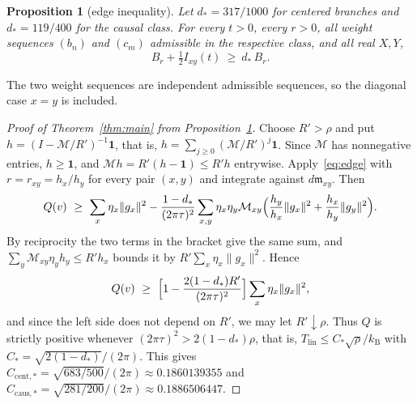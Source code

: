 \documentclass[10pt]{article}
\newtheorem{proposition}[theorem]{Proposition}
\theoremstyle{remark}
\newcommand{\kB}{k_{\mathrm B}}
\newcommand{\Tlin}{T_{\mathrm{lin}}}
\newcommand{\dstar}{d_{*}}
\begin{document}
\begin{proposition}[edge inequality]\label{prop:edge}
Let $\dstar=317/1000$ for centered branches and $\dstar=119/400$ for the causal class. For every $t>0$, every $r>0$, all weight sequences $(b_n)$ and $(c_m)$ admissible in the respective class, and all real $X,Y$,
\begin{equation}\label{eq:edge}
B_r+\tfrac12I_{xy}(t)\ \ge\ \dstar\,B_r .
\end{equation}
\end{proposition}

The two weight sequences are independent admissible sequences, so the diagonal case $x=y$ is included.

\begin{proof}[Proof of Theorem~\ref{thm:main} from Proposition~\ref{prop:edge}]
Choose $R'>\rho$ and put $h=(I-\mathcal M/R')^{-1}\mathbf 1$, that is, $h=\sum_{j\ge0}(\mathcal M/R')^j\mathbf 1$. Since $\mathcal M$ has nonnegative entries, $h\ge\mathbf 1$, and $\mathcal Mh=R'(h-\mathbf 1)\le R'h$ entrywise. Apply~\eqref{eq:edge} with $r=r_{xy}=h_x/h_y$ for every pair $(x,y)$ and integrate against $d\mathfrak m_{xy}$. Then
\[
Q(v)\ \ge\ \sum_x\eta_x\|g_x\|^2-\frac{1-\dstar}{(2\pi\tau)^2}\sum_{x,y}\eta_x\eta_y\mathcal M_{xy}\Bigl(\frac{h_y}{h_x}\|g_x\|^2+\frac{h_x}{h_y}\|g_y\|^2\Bigr).
\]
By reciprocity the two terms in the bracket give the same sum, and $\sum_y\mathcal M_{xy}\eta_yh_y\le R'h_x$ bounds it by $R'\sum_x\eta_x\|g_x\|^2$. Hence
\[
Q(v)\ \ge\ \Bigl[1-\frac{2(1-\dstar)R'}{(2\pi\tau)^2}\Bigr]\sum_x\eta_x\|g_x\|^2 ,
\]
and since the left side does not depend on $R'$, we may let $R'\downarrow\rho$. Thus $Q$ is strictly positive whenever $(2\pi\tau)^2>2(1-\dstar)\rho$, that is, $\Tlin\le C_*\sqrt\rho/\kB$ with $C_*=\sqrt{2(1-\dstar)}/(2\pi)$. This gives $C_{\mathrm{cent},*}=\sqrt{683/500}/(2\pi)\approx0.1860139355$ and $C_{\mathrm{caus},*}=\sqrt{281/200}/(2\pi)\approx0.1886506447$.


\end{proof}
\end{document}
